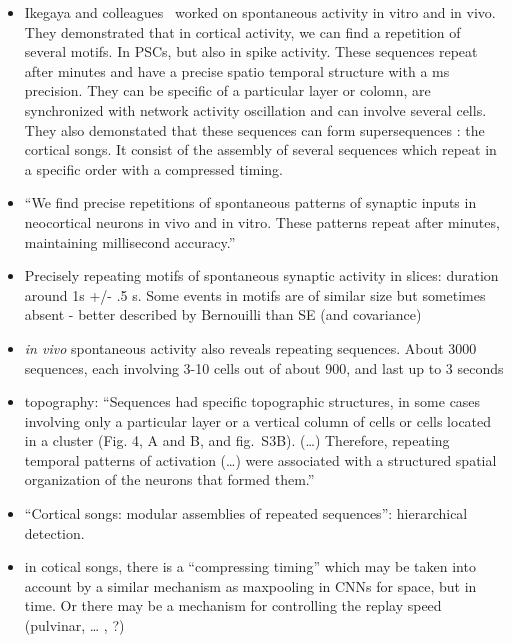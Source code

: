 \documentclass[brainsci, %
               review,submit,pdftex,moreauthors]{Definitions/mdpi}
\begin{document}
\begin{itemize}
 \item
  Ikegaya and colleagues~\citep{ikegaya_synfire_2004} worked on spontaneous activity in vitro and in vivo. They demonstrated that in cortical activity, we can find a repetition of several motifs. In PSCs, but also in spike activity. These sequences repeat after minutes and have a precise spatio temporal structure with a ms precision. They can be specific of a particular layer or colomn, are synchronized with network activity oscillation and can involve several cells. They also demonstated that these sequences can form supersequences : the cortical songs. It consist of the assembly of several sequences which repeat in a specific order with a compressed timing.
\item
  ``We find precise repetitions of spontaneous patterns of synaptic inputs in neocortical neurons in vivo and in vitro. These patterns repeat after minutes, maintaining millisecond accuracy.''
\item
  Precisely repeating motifs of spontaneous synaptic activity in slices: duration around 1s +/- .5 s. Some events in motifs are of similar size but sometimes absent - better described by Bernouilli than SE (and covariance)
\item
  \emph{in vivo} spontaneous activity also reveals repeating sequences. About 3000 sequences, each involving 3-10 cells out of about 900, and last up to 3 seconds
\item
  topography: ``Sequences had specific topographic structures, in some cases involving only a particular layer or a vertical column of cells or cells located in a cluster (Fig. 4, A and B, and fig.~S3B). (\ldots) Therefore, repeating temporal patterns of activation (\ldots) were associated with a structured spatial organization of the neurons that formed them.''
\item
  ``Cortical songs: modular assemblies of repeated sequences'': hierarchical detection.
\item
  in cotical songs, there is a ``compressing timing'' which may be taken into account by a similar mechanism as maxpooling in CNNs for space, but in time. Or there may be a mechanism for controlling the replay speed (pulvinar, \ldots{} , ?)
\end{itemize}
\end{document}

